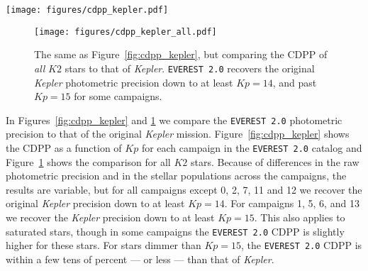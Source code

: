 \documentclass[]{emulateapj}
\newcommand{\Kp}{\ensuremath{Kp}}
\newcommand{\edited}[1]{{\color{red} #1}}
\begin{document}
\begin{figure*}[hbt]
  \begin{center}
      \texttt{[image: figures/cdpp\_kepler.pdf]}
       \caption{6 hr photometric precision as a function of \emph{Kepler} magnitude $\Kp$ for all
       stars observed by \emph{Kepler} (yellow dots) and for all $K2$ targets in Campaigns 0-8
       de-trended with \texttt{EVEREST} (blue). The median in 0.5 magnitude-wide bins is indicated
       by yellow circles for \emph{Kepler} and by blue circles for \texttt{EVEREST}. For campaigns
       1, 5, and 6, \texttt{EVEREST} recovers the raw \emph{Kepler} photometric precision down to
       at least $\Kp = 15$; for campaigns 3, 4, and 8, \texttt{EVEREST} recovers the \emph{Kepler}
       precision down to $\Kp = 14$. Campaigns 0 and 2 have a larger fraction of (variable) giant
       stars, leading to a higher average CDPP, while campaign 7 raw light curves
       have significantly worse precision due to increased
       spacecraft motion caused by torque imbalances on the spacecraft during this campaign.
       \edited{Campaign 11 light curves display a similar excess in residual noise, in particular during the first
       sub-campaign. Like campaign 7, this campaign observed targets near the galactic bulge, where
       crowding also contributed to poorer performance than average.}}
     \label{fig:cdpp_kepler}
  \end{center}
\end{figure*}

\begin{figure}[hbt]
  \begin{center}
      \texttt{[image: figures/cdpp\_kepler\_all.pdf]}
       \caption{The same as Figure~\ref{fig:cdpp_kepler}, but comparing the CDPP of \emph{all} $K2$ stars
                to that of \emph{Kepler}. \texttt{EVEREST 2.0} recovers the original \emph{Kepler}
                photometric precision down to at least $\Kp = 14$, and past $\Kp = 15$ for some
                campaigns.}
     \label{fig:cdpp_kepler_all}
  \end{center}
\end{figure}

In Figures~\ref{fig:cdpp_kepler} and \ref{fig:cdpp_kepler_all} we compare the \texttt{EVEREST 2.0}
photometric precision to that of the original \emph{Kepler} mission. Figure~\ref{fig:cdpp_kepler}
shows the CDPP as a function of $\Kp$ for each \edited{campaign in the \texttt{EVEREST 2.0} catalog} and
Figure~\ref{fig:cdpp_kepler_all} shows the comparison for all $K2$ stars. Because of differences
in the raw photometric precision and in the stellar populations across the campaigns, the
results are variable, but for all campaigns except \edited{0, 2, 7, 11 and 12} we recover the original \emph{Kepler}
precision down to at least $\Kp = 14$. For campaigns \edited{1, 5, 6, and 13} we recover the \emph{Kepler}
precision down to at least $\Kp = 15$. This also applies to saturated stars, though in some
campaigns the \texttt{EVEREST 2.0} CDPP is slightly higher for these stars. For stars
dimmer than $\Kp = 15$, the \texttt{EVEREST 2.0} CDPP is within a few tens of percent ---
or less --- than that of \emph{Kepler}.
\end{document}
